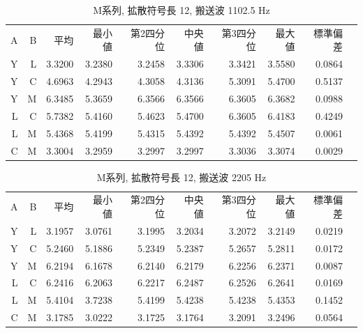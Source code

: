 \begin{table}[p]\centering
  \caption{M系列, 拡散符号長 12, 搬送波 1102.5 Hz}
  \label{tab:hikaku21}
  \begin{tabular}{rrrrrrrrrr}
    \hline
     A & B & 平均 & 最小値 & 第2四分位 & 中央値 & 第3四分位 & 最大値 & 標準偏差 \\
     Y & L & 3.3200 & 3.2380 & 3.2458 & 3.3306 & 3.3421 & 3.5580 & 0.0864 \\
     Y & C & 4.6963 & 4.2943 & 4.3058 & 4.3136 & 5.3091 & 5.4700 & 0.5137 \\
     Y & M & 6.3485 & 5.3659 & 6.3566 & 6.3566 & 6.3605 & 6.3682 & 0.0988 \\
     L & C & 5.7382 & 5.4160 & 5.4623 & 5.4700 & 6.3605 & 6.4183 & 0.4249 \\
     L & M & 5.4368 & 5.4199 & 5.4315 & 5.4392 & 5.4392 & 5.4507 & 0.0061 \\
     C & M & 3.3004 & 3.2959 & 3.2997 & 3.2997 & 3.3036 & 3.3074 & 0.0029 \\
    \hline
  \end{tabular}
\end{table}

\begin{table}[p]\centering
  \caption{M系列, 拡散符号長 12, 搬送波 2205 Hz}
  \label{tab:hikaku22}
  \begin{tabular}{rrrrrrrrrr}
    \hline
     A & B & 平均 & 最小値 & 第2四分位 & 中央値 & 第3四分位 & 最大値 & 標準偏差 \\
     Y & L & 3.1957 & 3.0761 & 3.1995 & 3.2034 & 3.2072 & 3.2149 & 0.0219 \\
     Y & C & 5.2460 & 5.1886 & 5.2349 & 5.2387 & 5.2657 & 5.2811 & 0.0172 \\
     Y & M & 6.2194 & 6.1678 & 6.2140 & 6.2179 & 6.2256 & 6.2371 & 0.0087 \\
     L & C & 6.2416 & 6.2063 & 6.2217 & 6.2487 & 6.2526 & 6.2641 & 0.0169 \\
     L & M & 5.4104 & 3.7238 & 5.4199 & 5.4238 & 5.4238 & 5.4353 & 0.1452 \\
     C & M & 3.1785 & 3.0222 & 3.1725 & 3.1764 & 3.2091 & 3.2496 & 0.0564 \\
    \hline
  \end{tabular}
\end{table}


